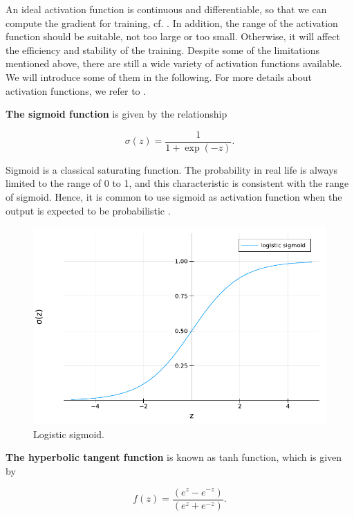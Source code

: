 \documentclass[
	parskip, 			   %
	twoside, 			   %
	DIV=14, 			   %
	BCOR=15.0mm, 		   %
	headsepline, 		   %
	open=right, 		   %
	captions=tableheading, %
	bibliography=totoc,    %
	numbers=noenddot       %
]{scrreprt}
\begin{document}
An ideal activation function is continuous and differentiable, so that we can compute the gradient for training, cf. \cite{goodfellow2016deep}. In addition, the range of the activation function should be suitable, not too large or too small. Otherwise, it will affect the efficiency and stability of the training. Despite some of the limitations mentioned above, there are still a wide variety of activation functions available. We will introduce some of them in the following. For more details about activation functions, we refer to \cite{nwankpa2018activation}\cite{dubey2022activation}.

\textbf{The sigmoid function} is given by the relationship

\begin{equation}
    \label{eq:sigmoid}
    \sigma(z)=\frac{1}{1+\exp (-z)}.
\end{equation}

Sigmoid is a classical saturating function. The probability in real life is always limited to the range of 0 to 1, and this characteristic is consistent with the range of sigmoid. Hence, it is common to use sigmoid as activation function when the output is expected to be probabilistic \cite{nwankpa2018activation}. 

\begin{figure}[h!]
    \centering
    \includegraphics[scale=0.6]{figures/sigmoid.pdf}
    \caption{Logistic sigmoid.}
    \label{fig:sigmoid}
\end{figure}

\textbf{The hyperbolic tangent function} is known as tanh function, which is given by

\begin{equation}
    \label{eq:tanh}
    f(z)=\frac{\left(e^{z}-e^{-z}\right)}{\left(e^{z}+e^{-z}\right)}.
\end{equation}
\end{document}
